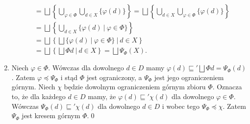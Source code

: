 \begin{dowod}
\begin{enumerate}
\begin{align*}
                        &= \bigsqcup \left\{\bigcup\limits_{\varphi\in\Phi}\bigcup\limits_{d\in X}\{\varphi(d)\}\right\}
                         =\bigsqcup \left\{\bigcup\limits_{d\in X}\bigcup\limits_{\varphi\in\Phi}\{\varphi(d)\}\right\}\\
                        &= \bigsqcup \left\{\bigcup\limits_{d\in X}\{\varphi(d)\ |\ \varphi\in\Phi \}\right\}\\
                        &= \bigsqcup \left\{\bigsqcup \{\varphi(d)\ |\ \varphi\in\Phi \}\ |\ d\in X\right\}\\
                        &= \bigsqcup \left\{\bigsqcup \Phi d\ |\ d\in X\right\}
                        = \bigsqcup \Psi_\Phi(X).
          \end{align*}
        \item Niech \(\varphi\in\Phi\). Wówczas dla dowolnego \(d\in D\) mamy \(\varphi(d)\sqsubseteq' \bigsqcup \Phi d = \Psi_{\Phi}(d)\). Zatem \(\varphi\preceq\Psi_\Phi\) i stąd \(\Phi\) jest ograniczony, a \(\Psi_\Phi\) jest jego ograniczeniem górnym. Niech \(\chi\) będzie dowolnym ograniczeniem górnym zbioru \(\Phi\). Oznacza to, że dla każdego \(d\in D\) mamy, że \(\varphi(d) \sqsubseteq'\chi(d)\) dla dowolnego \(\varphi\in \Phi\). Wówczas \(\Psi_\Phi(d)\sqsubseteq'\chi(d)\) dla dowolnego \(d\in D\) i wobec tego \(\Psi_\Phi\preceq \chi\). Zatem \(\Psi_\Phi\) jest kresem górnym \(\Phi\).\qed
          



\end{enumerate}
\end{dowod}

